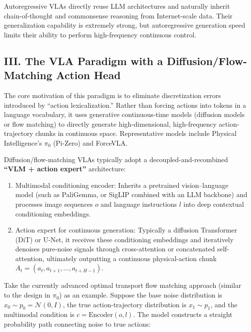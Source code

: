 Autoregressive VLAs directly reuse LLM architectures and naturally inherit chain-of-thought and commonsense reasoning from Internet-scale data. Their generalization capability is extremely strong, but autoregressive generation speed limits their ability to perform high-frequency continuous control.

\hypertarget{iii.-the-vla-paradigm-with-a-diffusionflow-matching-action-head}{%
\subsection{III. The VLA Paradigm with a Diffusion/Flow-Matching Action Head}\label{iii.-the-vla-paradigm-with-a-diffusionflow-matching-action-head}}

The core motivation of this paradigm is to eliminate discretization errors introduced by ``action lexicalization.'' Rather than forcing actions into tokens in a language vocabulary, it uses generative continuous-time models (diffusion models or flow matching) to directly generate high-dimensional, high-frequency action-trajectory chunks in continuous space. Representative models include Physical Intelligence's \(\pi_0\) (Pi-Zero) and ForceVLA.

Diffusion/flow-matching VLAs typically adopt a decoupled-and-recombined \textbf{``VLM + action expert''} architecture:

\begin{enumerate}
\def\labelenumi{\arabic{enumi}.}
\item
  Multimodal conditioning encoder: Inherits a pretrained vision--language model (such as PaliGemma, or SigLIP combined with an LLM backbone) and processes image sequences \(o\) and language instructions \(l\) into deep contextual conditioning embeddings.
\item
  Action expert for continuous generation: Typically a diffusion Transformer (DiT) or U-Net, it receives these conditioning embeddings and iteratively denoises pure-noise signals through cross-attention or concatenated self-attention, ultimately outputting a continuous physical-action chunk \(A_t=(a_t,a_{t+1},\ldots,a_{t+H-1})\).
\end{enumerate}

Take the currently advanced optimal transport flow matching approach (similar to the design in \(\pi_0\)) as an example. Suppose the base noise distribution is \(x_0\sim p_0=\mathcal{N}(0,I)\), the true action-trajectory distribution is \(x_1\sim p_1\), and the multimodal condition is \(c=\mathrm{Encoder}(o,l)\). The model constructs a straight probability path connecting noise to true actions:

